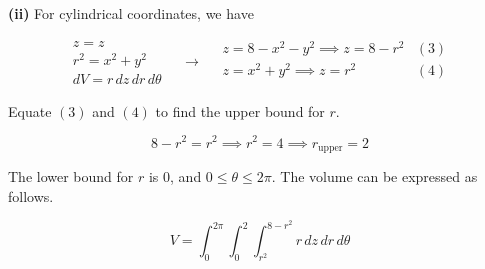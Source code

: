\documentclass{article}
\begin{document}
\textbf{(ii)} For cylindrical coordinates, we have

\[
\begin{array}{c}
z=z\\
r^2=x^2+y^2\\
dV=r\,dz\,dr\,d\theta
\end{array}\quad\rightarrow\quad
\begin{array}{lc}
z=8-x^2-y^2\implies z=8-r^2 & (3)\\[1em]
z=x^2+y^2\implies z=r^2 & (4)\\
\end{array}
\]

Equate $(3)$ and $(4)$ to find the upper bound for $r$.

\[8-r^2=r^2\implies r^2=4\implies r_{\text{upper}}=2\]

The lower bound for $r$ is 0, and $0\leq\theta\leq2\pi$. The volume can be expressed as follows.

\[\boxed{V=\int_0^{2\pi}\int_0^2\int_{r^2}^{8-r^2}r\,dz\,dr\,d\theta}\]
\end{document}
